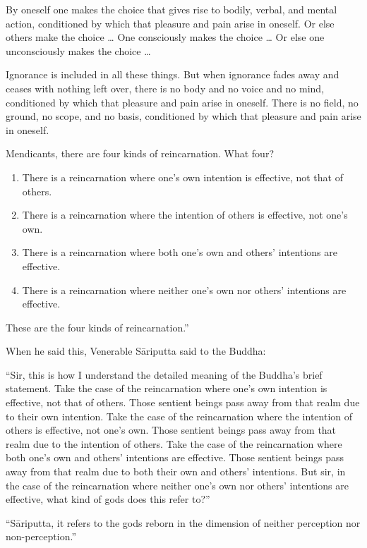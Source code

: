 \documentclass[12pt,openany]{book}%
\begin{document}
By oneself one makes the choice that gives rise to bodily, verbal, and mental action, conditioned by which that pleasure and pain arise in oneself. Or else others make the choice … One consciously makes the choice … Or else one unconsciously makes the choice … 

Ignorance is included in all these things. But when ignorance fades away and ceases with nothing left over, there is no body and no voice and no mind, conditioned by which that pleasure and pain arise in oneself. There is no field, no ground, no scope, and no basis, conditioned by which that pleasure and pain arise in oneself. 

Mendicants, there are four kinds of reincarnation. What four? 

\begin{enumerate}%
\item There is a reincarnation where one’s own intention is effective, not that of others. %
\item There is a reincarnation where the intention of others is effective, not one’s own. %
\item There is a reincarnation where both one’s own and others’ intentions are effective. %
\item There is a reincarnation where neither one’s own nor others’ intentions are effective. %
\end{enumerate}

These are the four kinds of reincarnation.” 

When he said this, Venerable \textsanskrit{Sāriputta} said to the Buddha: 

“Sir, this is how I understand the detailed meaning of the Buddha’s brief statement. Take the case of the reincarnation where one’s own intention is effective, not that of others. Those sentient beings pass away from that realm due to their own intention. Take the case of the reincarnation where the intention of others is effective, not one’s own. Those sentient beings pass away from that realm due to the intention of others. Take the case of the reincarnation where both one’s own and others’ intentions are effective. Those sentient beings pass away from that realm due to both their own and others’ intentions. But sir, in the case of the reincarnation where neither one’s own nor others’ intentions are effective, what kind of gods does this refer to?” 

“\textsanskrit{Sāriputta}, it refers to the gods reborn in the dimension of neither perception nor non-perception.” 
\end{document}
